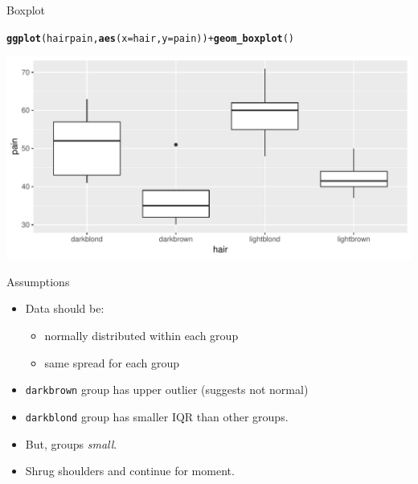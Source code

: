 \documentclass[unknownkeysallowed]{beamer}\usepackage[]{graphicx}\usepackage[]{color}
\makeatletter
\def\maxwidth{ %
  \ifdim\Gin@nat@width>\linewidth
    \linewidth
  \else
    \Gin@nat@width
  \fi
}
\newcommand{\hlopt}[1]{\textcolor[rgb]{0,0,0}{#1}}%
\newcommand{\hlstd}[1]{\textcolor[rgb]{0.345,0.345,0.345}{#1}}%
\newcommand{\hlkwc}[1]{\textcolor[rgb]{0.333,0.667,0.333}{#1}}%
\newcommand{\hlkwd}[1]{\textcolor[rgb]{0.737,0.353,0.396}{\textbf{#1}}}%
\newenvironment{kframe}{%
 \def\at@end@of@kframe{}%
 \ifinner\ifhmode%
  \def\at@end@of@kframe{\end{minipage}}%
  \begin{minipage}{\columnwidth}%
 \fi\fi%
 \def\FrameCommand##1{\hskip\@totalleftmargin \hskip-\fboxsep
 \colorbox{shadecolor}{##1}\hskip-\fboxsep
     \hskip-\linewidth \hskip-\@totalleftmargin \hskip\columnwidth}%
 \MakeFramed {\advance\hsize-\width
   \@totalleftmargin\z@ \linewidth\hsize
   \@setminipage}}%
 {\par\unskip\endMakeFramed%
 \at@end@of@kframe}
\newenvironment{knitrout}{}{} %
\makeatother
\begin{document}
\begin{frame}[fragile]{Boxplot}
  
\begin{knitrout}
\color{fgcolor}\begin{kframe}
\begin{alltt}
\hlkwd{ggplot}\hlstd{(hairpain,}\hlkwd{aes}\hlstd{(}\hlkwc{x}\hlstd{=hair,}\hlkwc{y}\hlstd{=pain))}\hlopt{+}\hlkwd{geom_boxplot}\hlstd{()}
\end{alltt}
\end{kframe}
\includegraphics[width=\maxwidth]{figure/tartuffo-1} 

\end{knitrout}
  
\end{frame}

\begin{frame}[fragile]{Assumptions}
  
  \begin{itemize}
  \item Data should be:
    \begin{itemize}
    \item normally distributed within each group
    \item same spread for each group
    \end{itemize}

  \item \texttt{darkbrown} group has upper outlier (suggests not normal)
  \item \texttt{darkblond} group has smaller IQR than other groups.
  \item But, groups \emph{small}.
  \item Shrug shoulders and continue for moment. 
  \end{itemize}
  
\end{frame}
\end{document}
